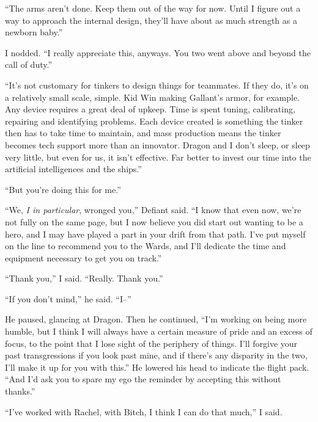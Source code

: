 ``The arms aren't done.  Keep them out of the way for now.  Until I figure out a way to approach the internal design, they'll have about as much strength as a newborn baby.''



I nodded.  ``I really appreciate this, anyways.  You two went above and beyond the call of duty.''



``It's not customary for tinkers to design things for teammates.  If they do, it's on a relatively small scale, simple.  Kid Win making Gallant's armor, for example.  Any device requires a great deal of upkeep.  Time is spent tuning, calibrating, repairing and identifying problems.  Each device created is something the tinker then has to take time to maintain, and mass production means the tinker becomes tech support more than an innovator.  Dragon and I don't sleep, or sleep very little, but even for us, it isn't effective.  Far better to invest our time into the artificial intelligences and the ships.''



``But you're doing this for me.''



``We, \emph{I in particular}, wronged you,'' Defiant said.  ``I know that even now, we're not fully on the same page, but I now believe you did start out wanting to be a hero, and I may have played a part in your drift from that path.  I've put myself on the line to recommend you to the Wards, and I'll dedicate the time and equipment necessary to get you on track.''



``Thank you,'' I said.  ``Really.  Thank you.''



``If you don't mind,'' he said.  ``I--''



He paused, glancing at Dragon.  Then he continued, ``I'm working on being more humble, but I think I will always have a certain measure of pride and an excess of focus, to the point that I lose sight of the periphery of things.  I'll forgive your past transgressions if you look past mine, and if there's any disparity in the two, I'll make it up for you with this.''  He lowered his head to indicate the flight pack.  ``And I'd ask you to spare my ego the reminder by accepting this without thanks.''



``I've worked with Rachel, with Bitch, I think I can do that much,'' I said.



